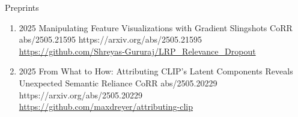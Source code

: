 \headedsubsection %
{Preprints}{}
{
    \begin{enumerate}
    
    
    
    
        
    
    
    
    
        \item {}
                        {2025}
                        {Manipulating Feature Visualizations with Gradient Slingshots}
                        {CoRR abs/2505.21595}
                        {https://arxiv.org/abs/2505.21595}
                        {
                            \\\href{https://github.com/Shreyas-Gururaj/LRP_Relevance_Dropout}{https://github.com/Shreyas-Gururaj/LRP\_Relevance\_Dropout}
                        }
                        
        \item {}
                        {2025}
                        {From What to How: Attributing CLIP's Latent Components Reveals Unexpected Semantic Reliance}
                        {CoRR abs/2505.20229}
                        {https://arxiv.org/abs/2505.20229}
                        {
                            \\\href{https://github.com/maxdreyer/attributing-clip}{https://github.com/maxdreyer/attributing-clip}
                        }
             

\end{enumerate}}
